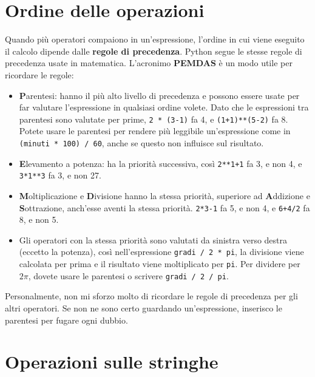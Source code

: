 \documentclass[10pt]{book}
\begin{document}
\section{Ordine delle operazioni}

Quando più operatori compaiono in un'espressione, l'ordine in cui viene eseguito il calcolo dipende dalle {\bf regole di precedenza}. Python segue le stesse regole di precedenza usate in matematica. L'acronimo {\bf PEMDAS} è un modo utile per ricordare le regole:

\begin{itemize}

\item {\bf P}arentesi: hanno il più alto livello di precedenza e possono  essere usate per far valutare l'espressione in qualsiasi ordine volete.    Dato che le espressioni tra parentesi sono valutate per prime, {\tt 2 * (3-1)} fa 4, e {\tt (1+1)**(5-2)} fa 8. Potete usare le parentesi per rendere più leggibile un'espressione come in {\tt (minuti * 100) / 60}, anche se questo non influisce sul risultato.

\item {\bf E}levamento a potenza: ha la priorità successiva, così
{\tt 2**1+1} fa 3, e non 4, e {\tt 3*1**3} fa 3, e non 27.

\item {\bf M}oltiplicazione e {\bf D}ivisione hanno la stessa priorità, superiore ad {\bf A}ddizione e {\bf S}ottrazione, anch'esse aventi la stessa priorità. {\tt 2*3-1} fa 5, e non 4, e {\tt 6+4/2} fa 8, e non 5.

\item Gli operatori con la stessa priorità sono valutati da sinistra verso destra (eccetto la potenza), così nell'espressione {\tt gradi / 2 * pi}, la divisione viene calcolata per prima e il risultato viene moltiplicato per {\tt pi}.  Per dividere per $2 \pi$, dovete usare le parentesi o scrivere {\tt gradi / 2 / pi}.

\end{itemize}

Personalmente, non mi sforzo molto di ricordare le regole di precedenza per gli altri operatori. Se non ne sono certo guardando un'espressione, inserisco le parentesi per fugare ogni dubbio.

\section{Operazioni sulle stringhe}
\end{document}

